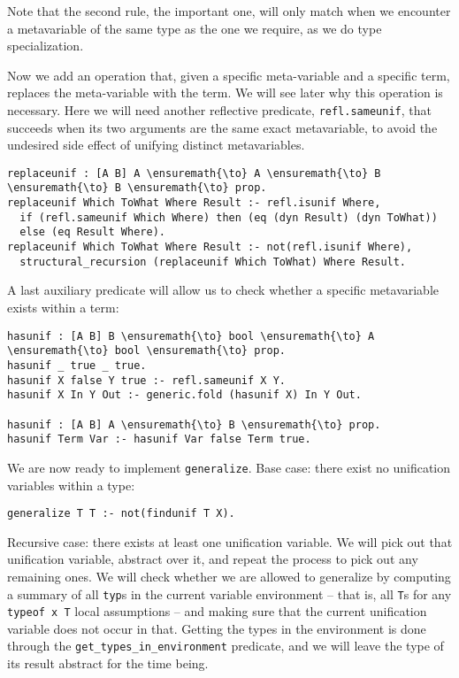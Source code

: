 Note that the second rule, the important one, will only match when we
encounter a metavariable of the same type as the one we require, as we
do type specialization.

Now we add an operation that, given a specific meta-variable and a
specific term, replaces the meta-variable with the term. We will see
later why this operation is necessary. Here we will need another
reflective predicate, \texttt{refl.sameunif}, that succeeds when its two
arguments are the same exact metavariable, to avoid the undesired side
effect of unifying distinct metavariables.

\begin{verbatim}
replaceunif : [A B] A \ensuremath{\to} A \ensuremath{\to} B \ensuremath{\to} B \ensuremath{\to} prop.
replaceunif Which ToWhat Where Result :- refl.isunif Where,
  if (refl.sameunif Which Where) then (eq (dyn Result) (dyn ToWhat))
  else (eq Result Where).
replaceunif Which ToWhat Where Result :- not(refl.isunif Where),
  structural_recursion (replaceunif Which ToWhat) Where Result.
\end{verbatim}

A last auxiliary predicate will allow us to check whether a specific
metavariable exists within a term:

\begin{verbatim}
hasunif : [A B] B \ensuremath{\to} bool \ensuremath{\to} A \ensuremath{\to} bool \ensuremath{\to} prop.
hasunif _ true _ true.
hasunif X false Y true :- refl.sameunif X Y.
hasunif X In Y Out :- generic.fold (hasunif X) In Y Out.

hasunif : [A B] A \ensuremath{\to} B \ensuremath{\to} prop.
hasunif Term Var :- hasunif Var false Term true.
\end{verbatim}

We are now ready to implement \texttt{generalize}. Base case: there
exist no unification variables within a type:

\begin{verbatim}
generalize T T :- not(findunif T X).
\end{verbatim}

Recursive case: there exists at least one unification variable. We will
pick out that unification variable, abstract over it, and repeat the
process to pick out any remaining ones. We will check whether we are
allowed to generalize by computing a summary of all \texttt{typ}s in the
current variable environment -- that is, all \texttt{T}s for any
\texttt{typeof\ x\ T} local assumptions -- and making sure that the
current unification variable does not occur in that. Getting the types
in the environment is done through the
\texttt{get\_types\_in\_environment} predicate, and we will leave the
type of its result abstract for the time being.


